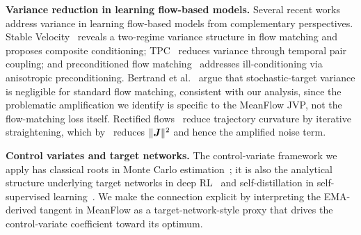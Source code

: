 \noindent\textbf{Variance reduction in learning flow-based models.} Several recent works address variance in learning flow-based models from complementary perspectives. Stable Velocity~\cite{yang2026stablevelocityvarianceperspective} reveals a two-regime variance structure in flow matching and proposes composite conditioning; TPC~\cite{maduabuchi2026temporalpairconsistencyvariancereduced} reduces variance through temporal pair coupling; and preconditioned flow matching~\cite{ahamed2026preconditionedscoreflowmatching} addresses ill-conditioning via anisotropic preconditioning. Bertrand et al.~\cite{bertrand2025closedformflowmatchinggeneralization} argue that stochastic-target variance is negligible for standard flow matching, consistent with our analysis, since the problematic amplification we identify is specific to the MeanFlow JVP, not the flow-matching loss itself. Rectified flows~\cite{liu2022flowstraightfastlearning,lee2024improvingrectifiedflows} reduce trajectory curvature by iterative straightening, which by~ reduces $\|{\bm{J}}\|^{2}$ and hence the amplified noise term.

\noindent\textbf{Control variates and target networks.} The control-variate framework we apply has classical roots in Monte Carlo estimation~\cite{glynn2002some}; it is also the analytical structure underlying target networks in deep RL~\cite{mnih2015human} and self-distillation in self-supervised learning~\cite{grill2020bootstrap}. We make the connection explicit by interpreting the EMA-derived tangent in MeanFlow as a target-network-style proxy that drives the control-variate coefficient toward its optimum.
